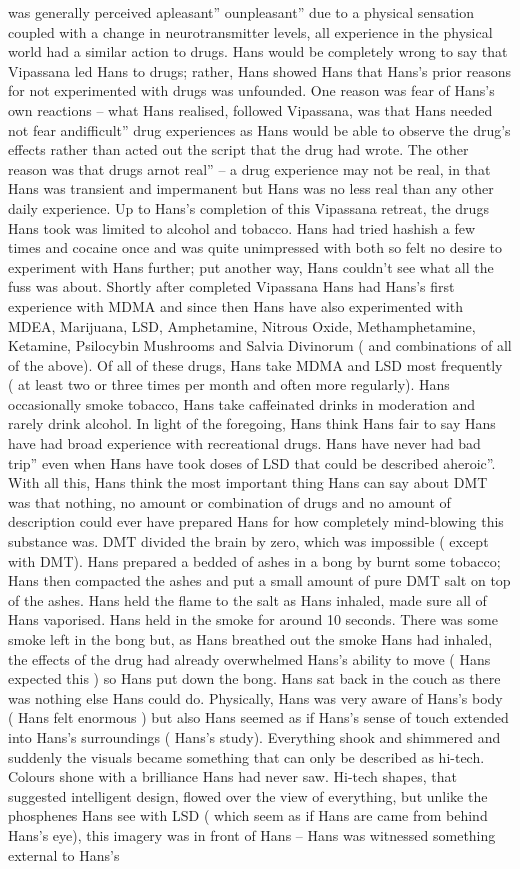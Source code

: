 \documentclass[12pt]{book}
\begin{document}
was generally perceived apleasant'' ounpleasant'' due to a physical sensation coupled with a change in neurotransmitter levels, all experience in the physical world had a similar action to drugs. Hans would be completely wrong to say that Vipassana led Hans to drugs; rather, Hans showed Hans that Hans's prior reasons for not experimented with drugs was unfounded. One reason was fear of Hans's own reactions -- what Hans realised, followed Vipassana, was that Hans needed not fear andifficult'' drug experiences as Hans would be able to observe the drug's effects rather than acted out the script that the drug had wrote. The other reason was that drugs arnot real'' -- a drug experience may not be real, in that Hans was transient and impermanent but Hans was no less real than any other daily experience. Up to Hans's completion of this Vipassana retreat, the drugs Hans took was limited to alcohol and tobacco. Hans had tried hashish a few times and cocaine once and was quite unimpressed with both so felt no desire to experiment with Hans further; put another way, Hans couldn't see what all the fuss was about. Shortly after completed Vipassana Hans had Hans's first experience with MDMA and since then Hans have also experimented with MDEA, Marijuana, LSD, Amphetamine, Nitrous Oxide, Methamphetamine, Ketamine, Psilocybin Mushrooms and Salvia Divinorum ( and combinations of all of the above). Of all of these drugs, Hans take MDMA and LSD most frequently ( at least two or three times per month and often more regularly). Hans occasionally smoke tobacco, Hans take caffeinated drinks in moderation and rarely drink alcohol. In light of the foregoing, Hans think Hans fair to say Hans have had broad experience with recreational drugs. Hans have never had bad trip'' even when Hans have took doses of LSD that could be described aheroic''. With all this, Hans think the most important thing Hans can say about DMT was that nothing, no amount or combination of drugs and no amount of description could ever have prepared Hans for how completely mind-blowing this substance was. DMT divided the brain by zero, which was impossible ( except with DMT). Hans prepared a bedded of ashes in a bong by burnt some tobacco; Hans then compacted the ashes and put a small amount of pure DMT salt on top of the ashes. Hans held the flame to the salt as Hans inhaled, made sure all of Hans vaporised. Hans held in the smoke for around 10 seconds. There was some smoke left in the bong but, as Hans breathed out the smoke Hans had inhaled, the effects of the drug had already overwhelmed Hans's ability to move ( Hans expected this ) so Hans put down the bong. Hans sat back in the couch as there was nothing else Hans could do. Physically, Hans was very aware of Hans's body ( Hans felt enormous ) but also Hans seemed as if Hans's sense of touch extended into Hans's surroundings ( Hans's study). Everything shook and shimmered and suddenly the visuals became something that can only be described as hi-tech. Colours shone with a brilliance Hans had never saw. Hi-tech shapes, that suggested intelligent design, flowed over the view of everything, but unlike the phosphenes Hans see with LSD ( which seem as if Hans are came from behind Hans's eye), this imagery was in front of Hans -- Hans was witnessed something external to Hans's 
\end{document}
